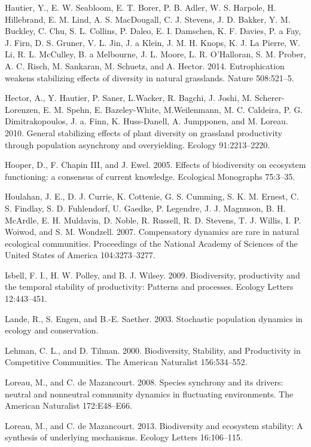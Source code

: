 \documentclass[11pt,]{article}
\begin{document}
Hautier, Y., E. W. Seabloom, E. T. Borer, P. B. Adler, W. S. Harpole, H.
Hillebrand, E. M. Lind, A. S. MacDougall, C. J. Stevens, J. D. Bakker,
Y. M. Buckley, C. Chu, S. L. Collins, P. Daleo, E. I. Damschen, K. F.
Davies, P. a Fay, J. Firn, D. S. Gruner, V. L. Jin, J. a Klein, J. M. H.
Knops, K. J. {La Pierre}, W. Li, R. L. McCulley, B. a Melbourne, J. L.
Moore, L. R. O'Halloran, S. M. Prober, A. C. Risch, M. Sankaran, M.
Schuetz, and A. Hector. 2014. Eutrophication weakens stabilizing effects
of diversity in natural grasslands. Nature 508:521--5.

Hector, A., Y. Hautier, P. Saner, L.Wacker, R. Bagchi, J. Joshi, M.
Scherer-Lorenzen, E. M. Spehn, E. Bazeley-White, M.Weilenmann, M. C.
Caldeira, P. G. Dimitrakopoulos, J. a. Finn, K. Huss-Danell, A.
Jumpponen, and M. Loreau. 2010. General stabilizing effects of plant
diversity on grassland productivity through population asynchrony and
overyielding. Ecology 91:2213--2220.

Hooper, D., F. {Chapin III}, and J. Ewel. 2005. Effects of biodiversity
on ecosystem functioning: a consensus of current knowledge. Ecological
Monographs 75:3--35.

Houlahan, J. E., D. J. Currie, K. Cottenie, G. S. Cumming, S. K. M.
Ernest, C. S. Findlay, S. D. Fuhlendorf, U. Gaedke, P. Legendre, J. J.
Magnuson, B. H. McArdle, E. H. Muldavin, D. Noble, R. Russell, R. D.
Stevens, T. J. Willis, I. P. Woiwod, and S. M. Wondzell. 2007.
Compensatory dynamics are rare in natural ecological communities.
Proceedings of the National Academy of Sciences of the United States of
America 104:3273--3277.

Isbell, F. I., H. W. Polley, and B. J. Wilsey. 2009. Biodiversity,
productivity and the temporal stability of productivity: Patterns and
processes. Ecology Letters 12:443--451.

Lande, R., S. Engen, and B.-E. Saether. 2003. Stochastic population
dynamics in ecology and conservation.

Lehman, C. L., and D. Tilman. 2000. Biodiversity, Stability, and
Productivity in Competitive Communities. The American Naturalist
156:534--552.

Loreau, M., and C. {{de Mazancourt}}. 2008. Species synchrony and its
drivers: neutral and nonneutral community dynamics in fluctuating
environments. The American Naturalist 172:E48--E66.

Loreau, M., and C. {{de Mazancourt}}. 2013. Biodiversity and ecosystem
stability: A synthesis of underlying mechanisms. Ecology Letters
16:106--115.
\end{document}

